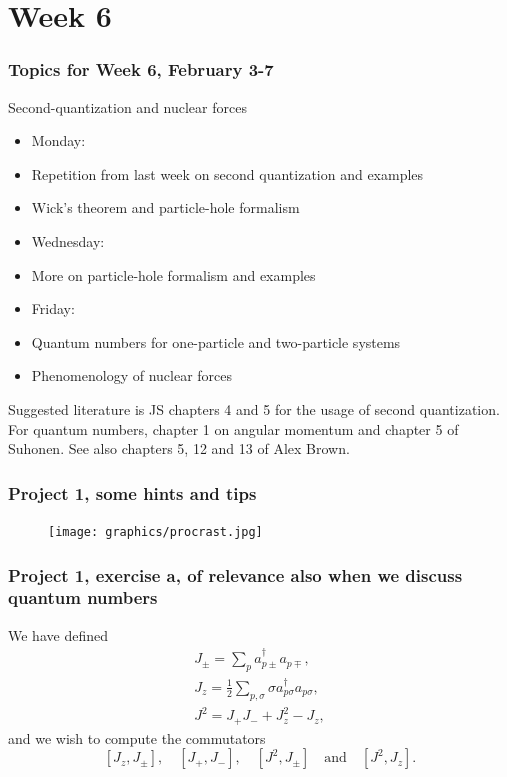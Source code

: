 \documentclass[compress]{beamer}
\begin{document}
\section[Week 6]{Week 6}

\frame
{
  \frametitle{Topics for Week 6, February 3-7}
  \begin{block}{Second-quantization and nuclear forces}
\begin{itemize}
\item Monday:
\item Repetition from last week on second quantization and examples
\item Wick's theorem and particle-hole formalism
\item Wednesday:
\item More on particle-hole formalism and examples
\item Friday:
\item Quantum numbers for one-particle and two-particle systems
\item Phenomenology of nuclear forces

\end{itemize}
Suggested literature is JS chapters 4 and 5 for the usage of second quantization. For quantum numbers, chapter 1 on angular momentum and chapter 5 of Suhonen.
See also chapters 5, 12 and 13 of Alex Brown.
  \end{block}
} 

\frame
{
  \frametitle{Project 1, some hints and tips}
    \begin{figure}
    \centering
            \texttt{[image: graphics/procrast.jpg]}
    \end{figure}
}

\frame
{
\frametitle{Project 1, exercise a, of relevance also when we discuss quantum numbers}

\begin{small}
{\scriptsize
We have defined
\begin{align}
J_{\pm} = \sum_p a_{p\pm}^\dagger a_{p\mp},
\label{eq:Jpm} \\
%
J_{z} = \frac{1}{2}\sum_{p,\sigma} \sigma a_{p\sigma}^\dagger a_{p\sigma},
\label{eq:Jz} \\
%
J^{2} = J_+ J_- + J_z^2 - J_z,
\label{eq:J2}
\end{align}
%
and we wish to compute the commutators
\[ [J_z,J_\pm], \quad [J_+,J_-], \quad [J^2,J_\pm] \quad \text{and} \quad 
[J^2,J_z]. \]
%
%

}
\end{small}
}
\end{document}
